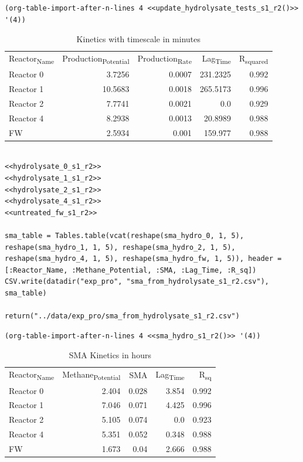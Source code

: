 \documentclass[11pt]{article}
\begin{document}
\begin{verbatim}
(org-table-import-after-n-lines 4 <<update_hydrolysate_tests_s1_r2()>> '(4))
\end{verbatim}

\begin{table}[htbp]
\caption{Kinetics with timescale in minutes}
\centering
\begin{tabular}{lrrrr}
Reactor\textsubscript{Name} & Production\textsubscript{Potential} & Production\textsubscript{Rate} & Lag\textsubscript{Time} & R\textsubscript{squared}\\[0pt]
Reactor 0 & 3.7256 & 0.0007 & 231.2325 & 0.992\\[0pt]
Reactor 1 & 10.5683 & 0.0018 & 265.5173 & 0.996\\[0pt]
Reactor 2 & 7.7741 & 0.0021 & 0.0 & 0.929\\[0pt]
Reactor 4 & 8.2938 & 0.0013 & 20.8989 & 0.988\\[0pt]
FW & 2.5934 & 0.001 & 159.977 & 0.988\\[0pt]
\end{tabular}
\end{table}

\begin{verbatim}

<<hydrolysate_0_s1_r2>>
<<hydrolysate_1_s1_r2>>
<<hydrolysate_2_s1_r2>>
<<hydrolysate_4_s1_r2>>
<<untreated_fw_s1_r2>>

sma_table = Tables.table(vcat(reshape(sma_hydro_0, 1, 5), reshape(sma_hydro_1, 1, 5), reshape(sma_hydro_2, 1, 5), reshape(sma_hydro_4, 1, 5), reshape(sma_hydro_fw, 1, 5)), header = [:Reactor_Name, :Methane_Potential, :SMA, :Lag_Time, :R_sq])
CSV.write(datadir("exp_pro", "sma_from_hydrolysate_s1_r2.csv"), sma_table)

return("../data/exp_pro/sma_from_hydrolysate_s1_r2.csv")
\end{verbatim}

\begin{verbatim}
(org-table-import-after-n-lines 4 <<sma_hydro_s1_r2()>> '(4))
\end{verbatim}

\begin{table}[htbp]
\caption{SMA Kinetics in hours}
\centering
\begin{tabular}{lrrrr}
Reactor\textsubscript{Name} & Methane\textsubscript{Potential} & SMA & Lag\textsubscript{Time} & R\textsubscript{sq}\\[0pt]
Reactor 0 & 2.404 & 0.028 & 3.854 & 0.992\\[0pt]
Reactor 1 & 7.046 & 0.071 & 4.425 & 0.996\\[0pt]
Reactor 2 & 5.105 & 0.074 & 0.0 & 0.923\\[0pt]
Reactor 4 & 5.351 & 0.052 & 0.348 & 0.988\\[0pt]
FW & 1.673 & 0.04 & 2.666 & 0.988\\[0pt]
\end{tabular}
\end{table}
\end{document}
